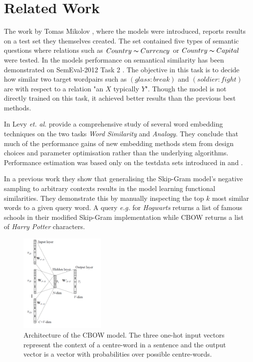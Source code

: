 \documentclass[conference]{IEEEtran}
\begin{document}
\section{Related Work}
\label{sec:relwork}

The work by Tomas Mikolov \cite{mikolov2013efficient}, where the models were introduced,
reports results on a test set they themselves created. The set contained five types of semantic
questions where relations such as $Country \thicksim Currency$ or $Country \thicksim Capital$
were tested. In \cite{mikolov2013linguistic} the models performance on semantical
similarity has been demonstrated on SemEval-2012 Task 2 \cite{jurgens2012semeval}.
The objective in this task is to decide how similar two target wordpairs such as
$(glass:break)$ and $(soldier:fight)$ are with respect to a relation "an $X$ typically $Y$". 
Though the model is not directly trained on this task, it achieved better results than  the previous
best methods. 

In \cite{levy2015improving} Levy \textit{et. al.} provide a comprehensive study of several word 
embedding techniques on the two tasks \textit{Word Similarity} and \textit{Analogy}. 
They conclude that much of the performance gains of new embedding
methods stem from design choices and parameter optimisation rather than the 
underlying algorithms. Performance estimation was based only on the testdata sets 
introduced in \cite{mikolov2013efficient} and \cite{mikolov2013linguistic}.

In a previous work \cite{levy2014dependency} they show that generalising the Skip-Gram 
model's negative sampling to arbitrary contexts results in the model learning 
functional similarities. They demonstrate this by manually inspecting the top $k$ most 
similar words to a given query word. A query \textit{e.g.} for \textit{Hogwarts} returns
a list of famous schools in their modified Skip-Gram implementation while CBOW returns 
a list of \textit{Harry Potter} characters.

\begin{figure}[t]
\centering
\includegraphics[width=0.375\textwidth]{cbow}
\caption{Architecture of the CBOW model. The three one-hot input vectors represent the context 
of a centre-word in a sentence and the output vector is a vector with probabilities over possible 
centre-words. }
\label{fig:cbow}
\end{figure}
\end{document}
